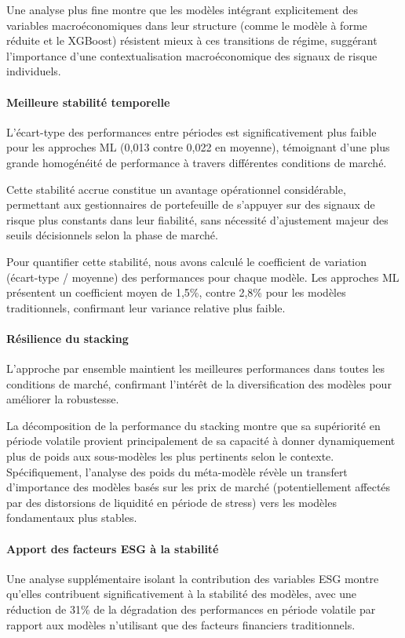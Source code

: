 Une analyse plus fine montre que les modèles intégrant explicitement des variables macroéconomiques dans leur structure (comme le modèle à forme réduite et le XGBoost) résistent mieux à ces transitions de régime, suggérant l'importance d'une contextualisation macroéconomique des signaux de risque individuels.

\paragraph{Meilleure stabilité temporelle} L'écart-type des performances entre périodes est significativement plus faible pour les approches ML (0,013 contre 0,022 en moyenne), témoignant d'une plus grande homogénéité de performance à travers différentes conditions de marché.

Cette stabilité accrue constitue un avantage opérationnel considérable, permettant aux gestionnaires de portefeuille de s'appuyer sur des signaux de risque plus constants dans leur fiabilité, sans nécessité d'ajustement majeur des seuils décisionnels selon la phase de marché.

Pour quantifier cette stabilité, nous avons calculé le coefficient de variation (écart-type / moyenne) des performances pour chaque modèle. Les approches ML présentent un coefficient moyen de 1,5\%, contre 2,8\% pour les modèles traditionnels, confirmant leur variance relative plus faible.

\paragraph{Résilience du stacking} L'approche par ensemble maintient les meilleures performances dans toutes les conditions de marché, confirmant l'intérêt de la diversification des modèles pour améliorer la robustesse.

La décomposition de la performance du stacking montre que sa supériorité en période volatile provient principalement de sa capacité à donner dynamiquement plus de poids aux sous-modèles les plus pertinents selon le contexte. Spécifiquement, l'analyse des poids du méta-modèle révèle un transfert d'importance des modèles basés sur les prix de marché (potentiellement affectés par des distorsions de liquidité en période de stress) vers les modèles fondamentaux plus stables.

\paragraph{Apport des facteurs ESG à la stabilité} Une analyse supplémentaire isolant la contribution des variables ESG montre qu'elles contribuent significativement à la stabilité des modèles, avec une réduction de 31\% de la dégradation des performances en période volatile par rapport aux modèles n'utilisant que des facteurs financiers traditionnels.

